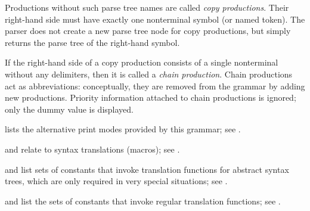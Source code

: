 \begin{isabellebody}
\begin{isamarkuptext}
\begin{description}
\begin{description}
  Productions without such parse tree names are called \emph{copy
  productions}.  Their right-hand side must have exactly one
  nonterminal symbol (or named token).  The parser does not create a
  new parse tree node for copy productions, but simply returns the
  parse tree of the right-hand symbol.

  If the right-hand side of a copy production consists of a single
  nonterminal without any delimiters, then it is called a \emph{chain
  production}.  Chain productions act as abbreviations: conceptually,
  they are removed from the grammar by adding new productions.
  Priority information attached to chain productions is ignored; only
  the dummy value  is displayed.

  \item {} lists the alternative print modes
  provided by this grammar; see .

  \item {} and  relate to
  syntax translations (macros); see .

  \item {} and  list sets of constants that invoke
  translation functions for abstract syntax trees, which are only
  required in very special situations; see .

  \item {} and 
  list the sets of constants that invoke regular translation
  functions; see .


\end{description}
\end{description}
\end{isamarkuptext}
\end{isabellebody}
